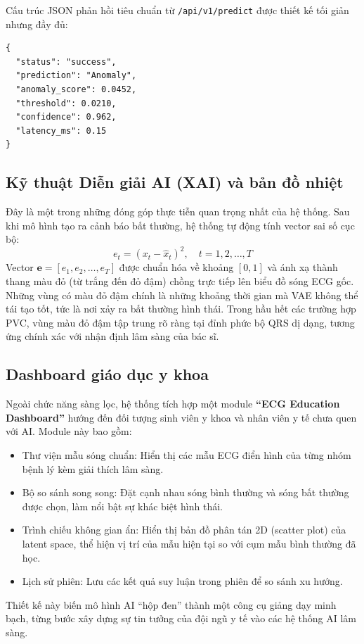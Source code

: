 \documentclass[conference]{IEEEtran}
\begin{document}
Cấu trúc JSON phản hồi tiêu chuẩn từ \texttt{/api/v1/predict} được thiết kế tối giản nhưng đầy đủ:
\begin{verbatim}
{
  "status": "success",
  "prediction": "Anomaly",
  "anomaly_score": 0.0452,
  "threshold": 0.0210,
  "confidence": 0.962,
  "latency_ms": 0.15
}
\end{verbatim}

\subsection{Kỹ thuật Diễn giải AI (XAI) và bản đồ nhiệt}
Đây là một trong những đóng góp thực tiễn quan trọng nhất của hệ thống. Sau khi mô hình tạo ra cảnh báo bất thường, hệ thống tự động tính vector sai số cục bộ:
\begin{equation}
e_t = (x_t - \hat{x}_t)^2, \quad t = 1, 2, \ldots, T
\end{equation}
Vector $\mathbf{e} = [e_1, e_2, \ldots, e_T]$ được chuẩn hóa về khoảng $[0,1]$ và ánh xạ thành thang màu đỏ (từ trắng đến đỏ đậm) chồng trực tiếp lên biểu đồ sóng ECG gốc. Những vùng có màu đỏ đậm chính là những khoảng thời gian mà VAE không thể tái tạo tốt, tức là nơi xảy ra bất thường hình thái. Trong hầu hết các trường hợp PVC, vùng màu đỏ đậm tập trung rõ ràng tại đỉnh phức bộ QRS dị dạng, tương ứng chính xác với nhận định lâm sàng của bác sĩ.

\subsection{Dashboard giáo dục y khoa}
Ngoài chức năng sàng lọc, hệ thống tích hợp một module \textbf{``ECG Education Dashboard''} hướng đến đối tượng sinh viên y khoa và nhân viên y tế chưa quen với AI. Module này bao gồm:
\begin{itemize}
\item Thư viện mẫu sóng chuẩn: Hiển thị các mẫu ECG điển hình của từng nhóm bệnh lý kèm giải thích lâm sàng.
\item Bộ so sánh song song: Đặt cạnh nhau sóng bình thường và sóng bất thường được chọn, làm nổi bật sự khác biệt hình thái.
\item Trình chiếu không gian ẩn: Hiển thị bản đồ phân tán 2D (scatter plot) của latent space, thể hiện vị trí của mẫu hiện tại so với cụm mẫu bình thường đã học.
\item Lịch sử phiên: Lưu các kết quả suy luận trong phiên để so sánh xu hướng.
\end{itemize}
Thiết kế này biến mô hình AI ``hộp đen'' thành một công cụ giảng dạy minh bạch, từng bước xây dựng sự tin tưởng của đội ngũ y tế vào các hệ thống AI lâm sàng.
\end{document}

